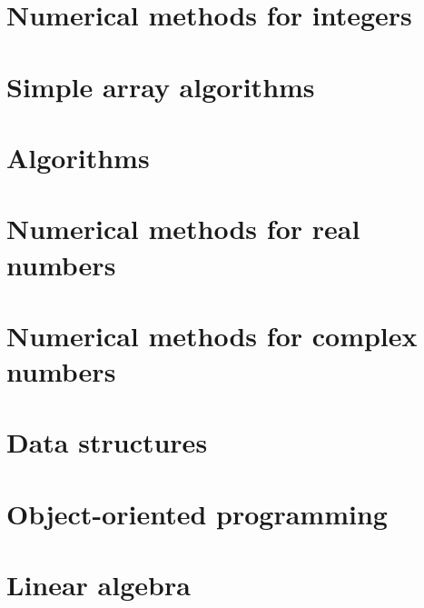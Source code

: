 \documentclass[oneside]{book}
\begin{document}
\part{Numerical methods for integers}




\part{Simple array algorithms}



\part{Algorithms}






\part{Numerical methods for real numbers}







\part{Numerical methods for complex numbers}


\part{Data structures}









\part{Object-oriented programming}




\part{Linear algebra}










\end{document}
